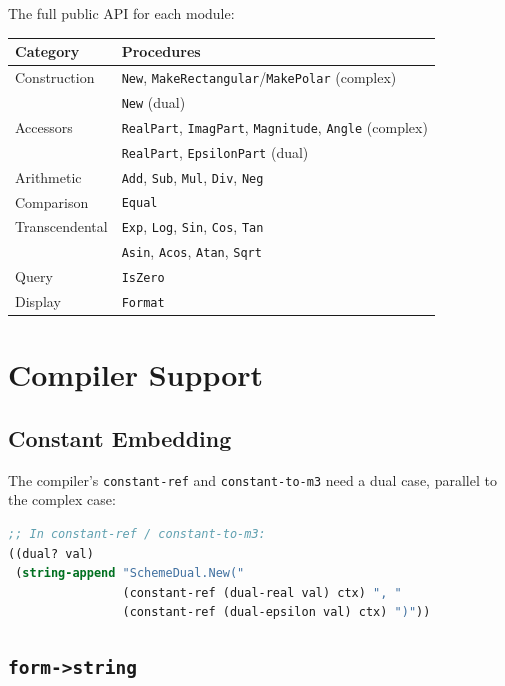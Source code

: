 \documentclass[12pt]{report}
\begin{document}
The full public API for each module:

\begin{center}
\small
\begin{tabular}{ll}
\toprule
Category & Procedures \\
\midrule
Construction   & {\tt New}, {\tt MakeRectangular}/{\tt MakePolar} (complex) \\
               & {\tt New} (dual) \\
Accessors      & {\tt RealPart}, {\tt ImagPart}, {\tt Magnitude}, {\tt Angle} (complex) \\
               & {\tt RealPart}, {\tt EpsilonPart} (dual) \\
Arithmetic     & {\tt Add}, {\tt Sub}, {\tt Mul}, {\tt Div}, {\tt Neg} \\
Comparison     & {\tt Equal} \\
Transcendental & {\tt Exp}, {\tt Log}, {\tt Sin}, {\tt Cos}, {\tt Tan} \\
               & {\tt Asin}, {\tt Acos}, {\tt Atan}, {\tt Sqrt} \\
Query          & {\tt IsZero} \\
Display        & {\tt Format} \\
\bottomrule
\end{tabular}
\end{center}

\chapter{Compiler Support}

\section{Constant Embedding}

The compiler's {\tt constant-ref} and {\tt constant-to-m3} need
a dual case, parallel to the complex case:

\begin{lstlisting}[language=Scheme]
;; In constant-ref / constant-to-m3:
((dual? val)
 (string-append "SchemeDual.New("
                (constant-ref (dual-real val) ctx) ", "
                (constant-ref (dual-epsilon val) ctx) ")"))
\end{lstlisting}

\section{{\tt form->string}}
\end{document}
